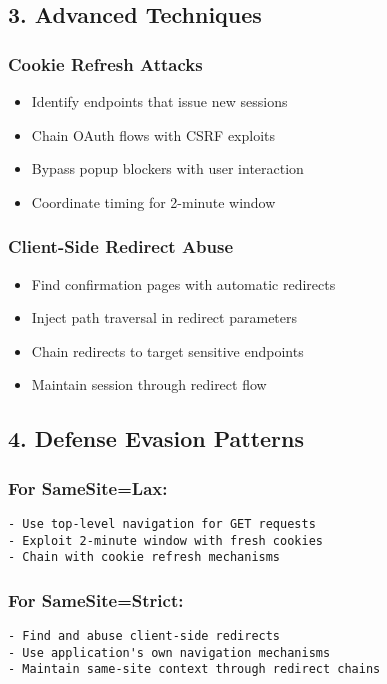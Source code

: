 \documentclass{article}
\begin{document}
\subsection*{3. Advanced Techniques}

\subsubsection*{Cookie Refresh Attacks}
\begin{itemize}
    \item Identify endpoints that issue new sessions
    \item Chain OAuth flows with CSRF exploits
    \item Bypass popup blockers with user interaction
    \item Coordinate timing for 2-minute window
\end{itemize}

\subsubsection*{Client-Side Redirect Abuse}
\begin{itemize}
    \item Find confirmation pages with automatic redirects
    \item Inject path traversal in redirect parameters
    \item Chain redirects to target sensitive endpoints
    \item Maintain session through redirect flow
\end{itemize}

\subsection*{4. Defense Evasion Patterns}

\subsubsection*{For SameSite=Lax:}
\begin{lstlisting}[frame=single, basicstyle=\footnotesize\ttfamily]
- Use top-level navigation for GET requests
- Exploit 2-minute window with fresh cookies
- Chain with cookie refresh mechanisms
\end{lstlisting}

\subsubsection*{For SameSite=Strict:}
\begin{lstlisting}[frame=single, basicstyle=\footnotesize\ttfamily]
- Find and abuse client-side redirects
- Use application's own navigation mechanisms
- Maintain same-site context through redirect chains
\end{lstlisting}
\end{document}
